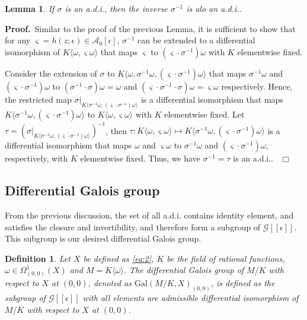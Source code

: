 \documentclass[preprint, 12pt]{elsarticle}
\newtheorem{lem}[thm]{Lemma}
\newtheorem{defn}[thm]{Definition}
\numberwithin{equation}{section}
\newenvironment{proof}[1][Proof]{\textbf{#1.}\ }{\ $\Box$}
\newcommand{\A}{\mathcal{A}}
\newcommand{\G}{\mathcal{G}}
\newcommand{\Gal}{\mathrm{Gal}}
\newcommand{\CA}{\G[[\epsilon]]}
\begin{document}
\begin{lem}
\label{le:33} If $\sigma$ is an a.d.i., then the inverse 
$\sigma^{-1}$ is alo an a.d.i..
\end{lem}
\begin{proof}Similar to the proof of the previous Lemma, it is sufficient to show that for
any $\varsigma = h(z;\epsilon)\in \A_0[\epsilon]$, $\sigma^{-1}$
can be extended to a differential isomorphism of $K\langle
\omega,\varsigma\omega\rangle $ that maps $\varsigma$ to
$(\varsigma\cdot\sigma^{-1})\omega$ with $K$ elementwise fixed.

Consider the extension of $\sigma$ to $K\langle \omega,
\sigma^{-1}\omega, (\varsigma\cdot\sigma^{-1})\omega\rangle$ that
maps $\sigma^{-1}\omega$ and $(\varsigma\cdot\sigma^{-1})\omega$
to $(\sigma^{-1}\cdot\sigma)\omega = \omega $ and
$(\varsigma\cdot\sigma^{-1}\cdot\sigma)\omega = \varsigma\omega$
respectively. Hence, the restricted map $\sigma|_{K\langle
\sigma^{-1}\omega,(\varsigma\cdot\sigma^{-1})\omega\rangle}$ is a
differential isomorphism that maps $K\langle \sigma^{-1}\omega,
(\varsigma\cdot\sigma^{-1})\omega\rangle$ to $K\langle \omega,
\varsigma\omega\rangle$ with $K$ elementwise fixed. Let $\tau =
\left(\sigma|_{K\langle \sigma^{-1}\omega,
(\varsigma\cdot\sigma^{-1})\omega\rangle}\right)^{-1}$, then
$\tau: K\langle \omega, \varsigma\omega\rangle\mapsto K\langle
\sigma^{-1}\omega, (\varsigma\cdot\sigma^{-1})\omega\rangle$ is a
differential isomorphism that maps $\omega$ and $\varsigma \omega$
to $\sigma^{-1}\omega$ and $(\varsigma\cdot\sigma^{-1})\omega$,
respectively, with $K$ elementwise fixed. Thus, we have
$\sigma^{-1} = \tau$ is an a.d.i..
\end{proof}

\subsection{Differential Galois group}
\label{sec:1.3} From the previous discussion, the set of all a.d.i. contains identity element, and satisfies the closure and invertibility, and therefore form a subgroup of $\CA$. This subgroup is our desired differential Galois group.
\begin{defn}
\label{def:5}Let $X$ be defined as \eqref{eq:2}, $K$ be the field
of rational functions, $\omega\in \Omega_{(0,0)}^1(X)$ and $M =
K\langle \omega\rangle$. The \textit{differential Galois group of
$M/K$ with respect to $X$ at $(0,0)$}, denoted as
$\Gal(M/K,X)_{(0,0)}$, is defined as the subgroup of $\CA$ with all elements are admissible differential isomorphism of $M/K$ with respect to $X$ at $(0,0)$.
\end{defn}
\end{document}
